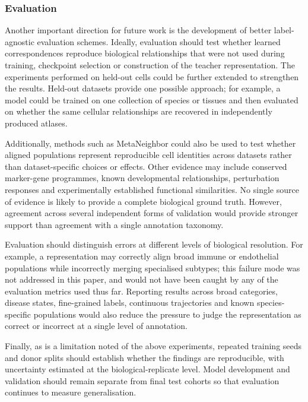 \documentclass{article}
\begin{document}
\subsubsection{Evaluation}
Another important direction for future work is the development of better label-agnostic evaluation schemes. Ideally, evaluation should test whether learned correspondences reproduce biological relationships that were not used during training, checkpoint selection or construction of the teacher representation. The experiments performed on held-out cells could be further extended to strengthen the results. Held-out datasets provide one possible approach; for example, a model could be trained on one collection of species or tissues and then evaluated on whether the same cellular relationships are recovered in independently produced atlases.

Additionally, methods such as MetaNeighbor \cite{MetaNeighbour} could also be used to test whether aligned populations represent reproducible cell identities across datasets rather than dataset-specific choices or effects. Other evidence may include conserved marker-gene programmes, known developmental relationships, perturbation responses and experimentally established functional similarities. No single source of evidence is likely to provide a complete biological ground truth. However, agreement across several independent forms of validation would provide stronger support than agreement with a single annotation taxonomy.

Evaluation should distinguish errors at different levels of biological resolution. For example, a representation may correctly align broad immune or endothelial populations while incorrectly merging specialised subtypes; this failure mode was not addressed in this paper, and would not have been caught by any of the evaluation metrics used thus far. Reporting results across broad categories, disease states, fine-grained labels, continuous trajectories and known species-specific populations would also reduce the pressure to judge the representation as correct or incorrect at a single level of annotation.

Finally, as is a limitation noted of the above experiments, repeated training seeds and donor splits should establish whether the findings are reproducible, with uncertainty estimated at the biological-replicate level. Model development and validation should remain separate from final test cohorts so that evaluation continues to measure generalisation.
\end{document}
